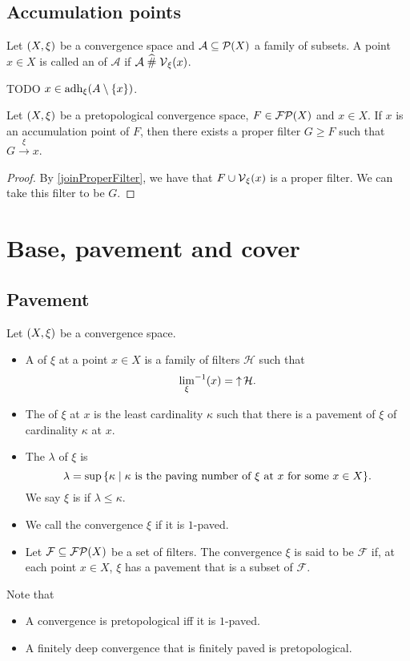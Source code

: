 \subsection{Accumulation points}
\begin{definition}
Let $\sSet{X,\xi}$ be a convergence space and $\mathcal{A}\subseteq \operatorname{\mathcal{P}}(X)$ a family of subsets. A point $x\in X$ is called an  of $\mathcal{A}$ if $\mathcal{A}\mathrel{\widehat{\#}} \operatorname{\mathcal{V}}_\xi(x)$.
\end{definition}

TODO $x\in \operatorname{adh}_\xi(A\setminus\{x\})$.

\begin{proposition} \label{subfilterToAccumulationPoint}
Let $\sSet{X,\xi}$ be a pretopological convergence space, $F\in\operatorname{\mathcal{FP}}(X)$ and $x\in X$. If $x$ is an accumulation point of $F$, then there exists a proper filter $G \geq F$ such that $G\overset{\xi}{\longrightarrow} x$. 
\end{proposition}
\begin{proof}
By \ref{joinProperFilter}, we have that $F\cup \operatorname{\mathcal{V}}_\xi(x)$ is a proper filter. We can take this filter to be $G$.
\end{proof}

\section{Base, pavement and cover}
\subsection{Pavement}
\begin{definition}
Let $\sSet{X,\xi}$ be a convergence space.
\begin{itemize}
\item A  of $\xi$ at a point $x\in X$ is a family of filters $\mathcal{H}$ such that
\[ {\lim_\xi}^{-1}(x) = \operatorname{\uparrow}\mathcal{H}. \]
\item The  of $\xi$ at $x$ is the least cardinality $\kappa$ such that there is a pavement of $\xi$ of cardinality $\kappa$ at $x$.
\item The  $\lambda$ of $\xi$ is
\[ \lambda = \sup\setbuilder{\kappa}{\text{$\kappa$ is the paving number of $\xi$ at $x$ for some $x\in X$}}. \]
We say $\xi$ is  if $\lambda \leq \kappa$.
\item We call the convergence $\xi$  if it is $1$-paved.
\item Let $\mathcal{F} \subseteq \operatorname{\mathcal{FP}}(X)$ be a set of filters. The convergence $\xi$ is said to be  $\mathcal{F}$ if, at each point $x\in X$, $\xi$ has a pavement that is a subset of $\mathcal{F}$.
\end{itemize}
\end{definition}
Note that
\begin{itemize}
\item A convergence is pretopological iff it is $1$-paved.
\item A finitely deep convergence that is finitely paved is pretopological.
\end{itemize}

